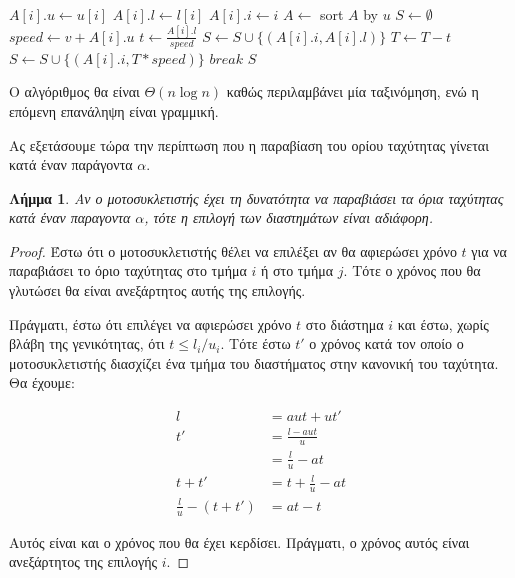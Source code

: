 \documentclass[11pt,a4paper]{book}
\newtheorem*{lemma}{Λήμμα}
\begin{document}
\begin{algorithm}[H]
\caption{\textgreek{Άσκηση 1}}
\begin{algorithmic}[1]
		\State $A[ i ].u \gets u[ i ]$
		\State $A[ i ].l \gets l[ i ]$
		\State $A[ i ].i \gets i$
	\EndFor
	\State $A \gets $ sort $A$ by $u$
	\State $S \gets \emptyset$
		\State $speed \gets v + A[ i ].u$
		\State $t \gets \frac{A[ i ].l}{speed}$
			\State $S \gets S \cup \{ ( A[ i ].i, A[ i ].l ) \}$
			\State $T \gets T - t$
		\Else
			\State $S \gets S \cup \{ ( A[ i ].i, T * speed ) \}$
			\State $break$
		\EndIf
	\EndFor
	\State \Return $S$
\EndProcedure
\end{algorithmic}
\end{algorithm}

Ο αλγόριθμος θα είναι $\Theta( n \log{n} )$ καθώς περιλαμβάνει μία ταξινόμηση, ενώ η επόμενη επανάληψη είναι γραμμική.

Ας εξετάσουμε τώρα την περίπτωση που η παραβίαση του ορίου ταχύτητας γίνεται κατά έναν παράγοντα $\alpha$.

\begin{lemma}
Αν ο μοτοσυκλετιστής έχει τη δυνατότητα να παραβιάσει τα όρια ταχύτητας κατά έναν παραγοντα $\alpha$, τότε η επιλογή των διαστημάτων είναι αδιάφορη.
\end{lemma}
\begin{proof}
Έστω ότι ο μοτοσυκλετιστής θέλει να επιλέξει αν θα αφιερώσει χρόνο $t$ για να παραβιάσει το όριο ταχύτητας στο τμήμα $i$ ή στο τμήμα $j$. Τότε ο χρόνος που θα γλυτώσει θα είναι ανεξάρτητος αυτής της επιλογής.

Πράγματι, έστω ότι επιλέγει να αφιερώσει χρόνο $t$ στο διάστημα $i$ και έστω, χωρίς βλάβη της γενικότητας, ότι $t \leq l_i / u_i$. Τότε έστω $t'$ ο χρόνος κατά τον οποίο ο μοτοσυκλετιστής διασχίζει ένα τμήμα του διαστήματος στην κανονική του ταχύτητα. Θα έχουμε:

\begin{align*}
 l &= aut + ut'\\
t' &= \frac{l - aut}{u}\\
   &= \frac{l}{u} - at\\
t + t' &= t + \frac{l}{u} - at\\
\frac{l}{u} - (t + t') &= at - t
\end{align*}

Αυτός είναι και ο χρόνος που θα έχει κερδίσει. Πράγματι, ο χρόνος αυτός είναι ανεξάρτητος της επιλογής $i$.
\end{proof}
\end{document}
